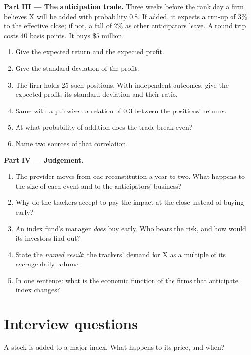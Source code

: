 \begin{problem}
\medskip\noindent\textbf{Part III --- The anticipation trade.}
Three weeks before the rank day a firm believes X will be added with
probability 0.8. If added, it expects a run-up of 3\% to the effective close;
if not, a fall of 2\% as other anticipators leave. A round trip costs 40
basis points. It buys \$5 million.
\begin{enumerate}[resume]
\item Give the expected return and the expected profit.
\item Give the standard deviation of the profit.
\item The firm holds 25 such positions. With independent outcomes, give the
expected profit, its standard deviation and their ratio.
\item Same with a pairwise correlation of 0.3 between the positions' returns.
\item At what probability of addition does the trade break even?
\item Name two sources of that correlation.
\end{enumerate}

\medskip\noindent\textbf{Part IV --- Judgement.}
\begin{enumerate}[resume]
\item The provider moves from one reconstitution a year to two. What happens
to the size of each event and to the anticipators' business?
\item Why do the trackers accept to pay the impact at the close instead of
buying early?
\item An index fund's manager \emph{does} buy early. Who bears the risk, and
how would its investors find out?
\item State the \emph{named result}: the trackers' demand for X as a multiple
of its average daily volume.
\item In one sentence: what is the economic function of the firms that
anticipate index changes?
\end{enumerate}
\end{problem}

\section{Interview questions}

\begin{interviewq}\label{iq:m1:index-construction-and-rebalancing:1}
A stock is added to a major index. What happens to its price, and when?
\end{interviewq}

